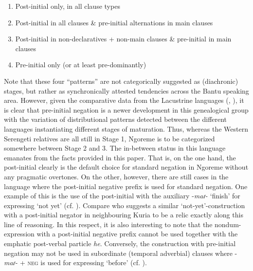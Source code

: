 \documentclass[output=paper,colorlinks,citecolor=brown,draftmode]{langscibook}
\begin{document}
\begin{enumerate}
    \item Post-initial only, in all clause types
    \item Post-initial in all clauses \& pre-initial alternations in main clauses
    \item Post-initial in non-declaratives + non-main clauses \& pre-initial in main clauses
    \item Pre-initial only (or at least pre-dominantly)
\end{enumerate}

Note that these four “patterns” are not categorically suggested as (diachronic) stages, but rather as synchronically attested tendencies across the Bantu speaking area. However, given the comparative data from the Lacustrine languages (\citealt[288--294]{Güldemann1996}, \citealt[fn. 43]{Güldemann1999}), it is clear that pre-initial negation is a newer development in this genealogical group with the variation of distributional patterns detected between the different languages instantiating different stages of maturation. Thus, whereas the Western Serengeti relatives are all still in Stage 1, Ngoreme is to be categorized somewhere between Stage 2 and 3. The in-between status in this language emanates from the facts provided in this paper. That is, on the one hand, the post-initial clearly is the default choice for standard negation in Ngoreme without any pragmatic overtones. On the other, however, there are still cases in the language where the post-initial negative prefix is used for standard negation. One example of this is the use of the post-initial with the auxiliary {}-\textit{maɾ}{}- ‘finish’ for expressing ‘not yet’ (cf. ). Compare \citet{Rose2001} who suggests a similar ‘not-yet’-construction with a post-initial negator in neighbouring Kuria to be a relic exactly along this line of reasoning. In this respect, it is also interesting to note that the nondum-expression with a post-initial negative prefix cannot be used together with the emphatic post-verbal particle \textit{he}. Conversely, the construction with pre-initial negation may not be used in subordinate (temporal adverbial) clauses where -\textit{maɾ}{}- + \textsc{neg} is used for expressing ‘before’ (cf. ).
\end{document}
